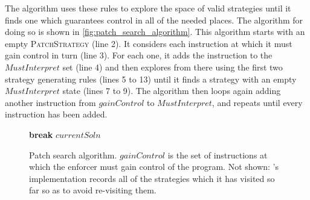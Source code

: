 The algorithm uses these rules to explore the space of
valid strategies until it finds one which guarantees control in all of
the needed places.  The algorithm for doing so is shown in
\autoref{fig:patch_search_algorithm}.  This algorithm starts with an
empty \textsc{PatchStrategy} (line 2).  It considers each instruction
at which it must gain control in turn (line 3).  For each one, it adds
the instruction to the $\mathit{MustInterpret}$ set (line 4) and then
explores from there using the first two strategy generating rules
(lines 5 to 13) until it finds a strategy with an empty
$\mathit{MustInterpret}$ state (lines 7 to 9).  The algorithm then
loops again adding another instruction from $\mathit{gainControl}$ to
$\mathit{MustInterpret}$, and repeats until every instruction has been
added.

\begin{figure}
  \begin{algorithmic}[1]
      \While {\true}
          \State \textbf{break}
        \Else
        \EndIf
      \EndWhile
    \EndFor
    \State \Return $\mathit{currentSoln}$
    \EndProcedure
  \end{algorithmic}
  \caption{Patch search algorithm.  $\mathit{gainControl}$ is the set
    of instructions at which the enforcer must gain control of the
    program.  Not shown: {\implementation}'s implementation records
    all of the strategies which it has visited so far so as to avoid
    re-visiting them.}
  \label{fig:patch_search_algorithm}
\end{figure}

